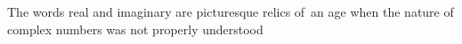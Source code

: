 \documentclass[preview]{standalone}
\begin{document}
\begin{center}
The words real and imaginary are picturesque relics of\
        an age when the nature of complex numbers was not properly understood
\end{center}
\end{document}
